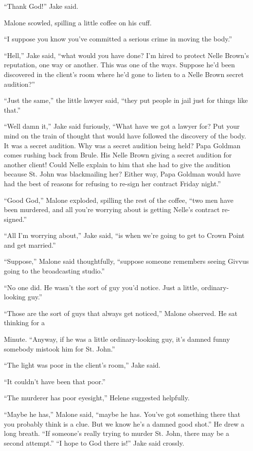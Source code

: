 \documentclass{novel}
\begin{document}
“Thank God!” Jake said.

Malone scowled, spilling a little coffee on his cuff.

“I suppose you know you’ve committed a serious crime in moving the body.”

“Hell,” Jake said, “what would you have done? I’m hired to protect Nelle Brown’s reputation, one way or another. This was one of the ways. Suppose he’d been discovered in the client’s room where he’d gone to listen to a Nelle Brown secret audition?”

“Just the same,” the little lawyer said, “they put people in jail just for things like that.”

“Well damn it,” Jake said furiously, “What have we got a lawyer for? Put your mind on the train of thought that would have followed the discovery of the body. It was a secret audition. Why was a secret audition being held? Papa Goldman comes rushing back from Brule. His Nelle Brown giving a secret audition for another client! Could Nelle explain to him that she had to give the audition because St. John was blackmailing her? Either way, Papa Goldman would have had the best of reasons for refusing to re-sign her contract Friday night.”

“Good God,” Malone exploded, spilling the rest of the coffee, “two men have been murdered, and all you’re worrying about is getting Nelle’s contract re-signed.”

“All I’m worrying about,” Jake said, “is when we’re going to get to Crown Point and get married.”

“Suppose,” Malone said thoughtfully, “suppose someone remembers seeing Givvus going to the broadcasting studio.”

“No one did. He wasn’t the sort of guy you’d notice. Just a little, ordinary-looking guy.”

“Those are the sort of guys that always get noticed,” Malone observed. He sat thinking for a

Minute. “Anyway, if he was a little ordinary-looking guy, it’s damned funny somebody mistook him for St. John.”

“The light was poor in the client’s room,” Jake said.

“It couldn’t have been that poor.”

“The murderer has poor eyesight,” Helene suggested helpfully.

“Maybe he has,” Malone said, “maybe he has. You’ve got something there that you probably think is a clue. But we know he’s a damned good shot.” He drew a long breath. “If someone’s really trying to murder St. John, there may be a second attempt.” “I hope to God there is!” Jake said crossly.
\end{document}
